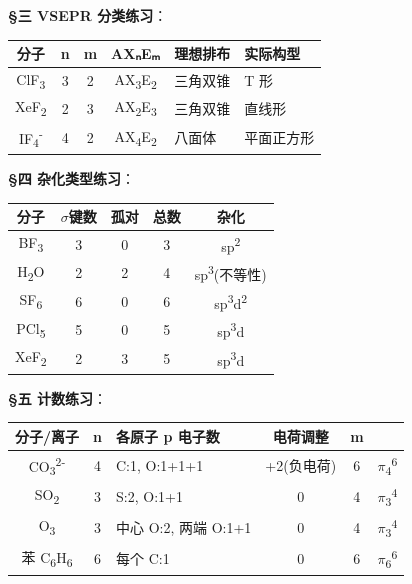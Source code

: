 \documentclass[a4paper,11pt]{ctexart}
\newcounter{none}
\newcommand{\箭}{\ensuremath{\rightarrow}}
\newcommand{\左箭}{\ensuremath{\leftarrow}}
\newcommand{\上箭}{\ensuremath{\uparrow}}
\newcommand{\下箭}{\ensuremath{\downarrow}}
\newcommand{\衡}{\ensuremath{\rightleftharpoons}}
\newcommand{\双箭}{\ensuremath{\leftrightarrow}}
\newcommand{\约等于}{\ensuremath{\approx}}
\newcommand{\小于等于}{\ensuremath{\leq}}
\newcommand{\大于等于}{\ensuremath{\geq}}
\newcommand{\不等于}{\ensuremath{\neq}}
\newcommand{\西格马}{\ensuremath{\sigma}}
\newcommand{\派}{\ensuremath{\pi}}
\begin{document}
\textbf{§三 VSEPR 分类练习}：

{\def\LTcaptype{none} %
\begin{longtable}[]{@{}ccccll@{}}
\toprule\noalign{}
分子 & n & m & AXₙEₘ & 理想排布 & 实际构型 \\
\midrule\noalign{}
\endhead
\bottomrule\noalign{}
\endlastfoot
ClF\textsubscript{3} & 3 & 2 & AX\textsubscript{3}E\textsubscript{2} & 三角双锥 & T 形 \\
XeF\textsubscript{2} & 2 & 3 & AX\textsubscript{2}E\textsubscript{3} & 三角双锥 & 直线形 \\
IF\textsubscript{4}\textsuperscript{-} & 4 & 2 & AX\textsubscript{4}E\textsubscript{2} & 八面体 & 平面正方形 \\
\end{longtable}
}

\textbf{§四 杂化类型练习}：

{\def\LTcaptype{none} %
\begin{longtable}[]{@{}ccccc@{}}
\toprule\noalign{}
分子 & \西格马 键数 & 孤对 & 总数 & 杂化 \\
\midrule\noalign{}
\endhead
\bottomrule\noalign{}
\endlastfoot
BF\textsubscript{3} & 3 & 0 & 3 & sp\textsuperscript{2} \\
H\textsubscript{2}O & 2 & 2 & 4 & sp\textsuperscript{3}(不等性) \\
SF\textsubscript{6} & 6 & 0 & 6 & sp\textsuperscript{3}d\textsuperscript{2} \\
PCl\textsubscript{5} & 5 & 0 & 5 & sp\textsuperscript{3}d \\
XeF\textsubscript{2} & 2 & 3 & 5 & sp\textsuperscript{3}d \\
\end{longtable}
}

\textbf{§五  计数练习}：

{\def\LTcaptype{none} %
\begin{longtable}[]{@{}cclccc@{}}
\toprule\noalign{}
分子/离子 & n & 各原子 p 电子数 & 电荷调整 & m &  \\
\midrule\noalign{}
\endhead
\bottomrule\noalign{}
\endlastfoot
CO\textsubscript{3}\textsuperscript{2-} & 4 & C:1, O:1+1+1 & +2(负电荷) & 6 & \派\textsubscript{4}\textsuperscript{6} \\
SO\textsubscript{2} & 3 & S:2, O:1+1 & 0 & 4 & \派\textsubscript{3}\textsuperscript{4} \\
O\textsubscript{3} & 3 & 中心 O:2, 两端 O:1+1 & 0 & 4 & \派\textsubscript{3}\textsuperscript{4} \\
苯 C\textsubscript{6}H\textsubscript{6} & 6 & 每个 C:1 & 0 & 6 & \派\textsubscript{6}\textsuperscript{6} \\
\end{longtable}
}
\end{document}
